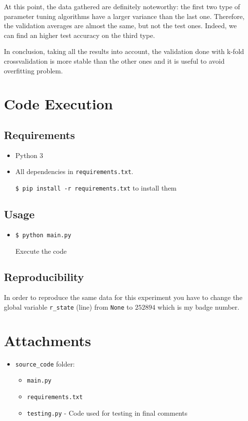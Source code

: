 \documentclass[a4paper, 11pt]{article}
\begin{document}
	At this point, the data gathered are definitely noteworthy: the first two type of parameter tuning algorithms have a larger variance than the last one. Therefore, the validation averages are almost the same, but not the test ones. Indeed, we can find an higher test accuracy on the third type.
	
	In conclusion, taking all the results into account, the validation done with k-fold crossvalidation is more stable than the other ones and it is useful to avoid overfitting problem.
		
	\section{Code Execution}
	\subsection{Requirements}
	\begin{itemize}
		\item Python 3
		\item All dependencies in \texttt{requirements.txt}.
		
		\texttt{\$ pip install -r requirements.txt} to install them
	\end{itemize}
	\subsection{Usage}
	\begin{itemize}
		\item \texttt{\$ python main.py}
		
		Execute the code
		
	\end{itemize}
	\subsection{Reproducibility}
	In order to reproduce the same data for this experiment you have to change the global variable \texttt{r\_state} (line) from \texttt{None} to $252894$ which is my badge number.

	\section*{Attachments}
	\begin{itemize}
		\item \texttt{source\_code} folder:
		\begin{itemize}
			\item \texttt{main.py}
			\item \texttt{requirements.txt}
			\item \texttt{testing.py} - Code used for testing in final comments
		\end{itemize}
	\end{itemize}
	
\end{document}
